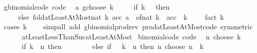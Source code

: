 \begin{isabellebody}
\isamarkupfalse%
%
\endisatagproof
{\isafoldproof}%
%
\isadelimproof
%
\endisadelimproof
%
\isadelimdocument
%
\endisadelimdocument
%
\isatagdocument
%
\isamarkuptrue%
%
\endisatagdocument
{\isafolddocument}%
%
\isadelimdocument
%
\endisadelimdocument
{}\isamarkupfalse%
\ gbinomial{\isacharunderscore}{\kern0pt}code\ {\isacharbrackleft}{\kern0pt}code{\isacharbrackright}{\kern0pt}{\isacharcolon}{\kern0pt}\isanewline
\ \ {\isachardoublequoteopen}a\ gchoose\ k\ {\isacharequal}{\kern0pt}\isanewline
\ \ \ \ {\isacharparenleft}{\kern0pt}if\ k\ {\isacharequal}{\kern0pt}\ {}\ then\ {}\isanewline
\ \ \ \ \ else\ fold{\isacharunderscore}{\kern0pt}atLeastAtMost{\isacharunderscore}{\kern0pt}nat\ {\isacharparenleft}{\kern0pt}{\isasymlambda}k\ acc{\isachardot}{\kern0pt}\ {\isacharparenleft}{\kern0pt}a\ {\isacharminus}{\kern0pt}\ of{\isacharunderscore}{\kern0pt}nat\ k{\isacharparenright}{\kern0pt}\ {\isacharasterisk}{\kern0pt}\ acc{\isacharparenright}{\kern0pt}\ {}\ {\isacharparenleft}{\kern0pt}k\ {\isacharminus}{\kern0pt}\ {}{\isacharparenright}{\kern0pt}\ {}\ {\isacharslash}{\kern0pt}\ fact\ k{\isacharparenright}{\kern0pt}{\isachardoublequoteclose}\isanewline
%
\isadelimproof
\ \ %
\endisadelimproof
%
\isatagproof
{}\isamarkupfalse%
\ {\isacharparenleft}{\kern0pt}cases\ k{\isacharparenright}{\kern0pt}\isanewline
\ \ \ \ {\isacharparenleft}{\kern0pt}simp{\isacharunderscore}{\kern0pt}all\ add{\isacharcolon}{\kern0pt}\ gbinomial{\isacharunderscore}{\kern0pt}prod{\isacharunderscore}{\kern0pt}rev\ prod{\isacharunderscore}{\kern0pt}atLeastAtMost{\isacharunderscore}{\kern0pt}code\ {\isacharbrackleft}{\kern0pt}symmetric{\isacharbrackright}{\kern0pt}\isanewline
\ \ \ \ \ \ atLeastLessThanSuc{\isacharunderscore}{\kern0pt}atLeastAtMost{\isacharparenright}{\kern0pt}%
\endisatagproof
{\isafoldproof}%
%
\isadelimproof
\isanewline
%
\endisadelimproof
\isanewline
{}\isamarkupfalse%
\ binomial{\isacharunderscore}{\kern0pt}code\ {\isacharbrackleft}{\kern0pt}code{\isacharbrackright}{\kern0pt}{\isacharcolon}{\kern0pt}\isanewline
\ \ {\isachardoublequoteopen}n\ choose\ k\ {\isacharequal}{\kern0pt}\isanewline
\ \ \ \ \ \ {\isacharparenleft}{\kern0pt}if\ k\ {\isachargreater}{\kern0pt}\ n\ then\ {}\isanewline
\ \ \ \ \ \ \ else\ if\ {}\ {\isacharasterisk}{\kern0pt}\ k\ {\isachargreater}{\kern0pt}\ n\ then\ n\ choose\ {\isacharparenleft}{\kern0pt}n\ {\isacharminus}{\kern0pt}\ k{\isacharparenright}{\kern0pt}\isanewline

\end{isabellebody}
